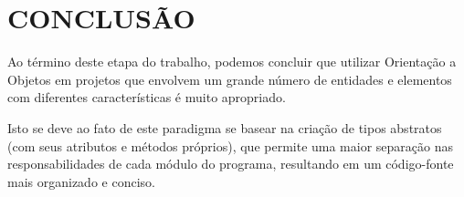 \documentclass[rel_mlp]{iiufrgs}
\begin{document}
%
\chapter{CONCLUSÃO}

Ao término deste etapa do trabalho, podemos concluir que utilizar Orientação a Objetos em projetos que envolvem um grande número de entidades e elementos com diferentes características é muito apropriado.

Isto se deve ao fato de este paradigma se basear na criação de tipos abstratos (com seus atributos e métodos próprios), que permite uma maior separação nas responsabilidades de cada módulo do programa, resultando em um código-fonte mais organizado e conciso.


%

%

\end{document}
